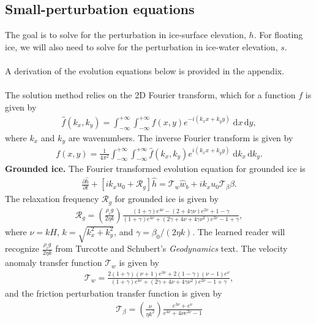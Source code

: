 \documentclass[paper=a4, fontsize=11pt]{article}
\begin{document}
\subsection*{Small-perturbation equations}
The goal is to solve for the perturbation in ice-surface elevation, $h$.
For floating ice, we will also need to solve for the perturbation
in ice-water elevation, $s$. \\ \\
A derivation of the evolution equations below is provided in the appendix.
\\ \\
The solution method relies on the 2D Fourier transform, which for a function $f$
is given by
\begin{align}
\hat{f}(k_x,k_y)  = \int_{-\infty}^{+\infty}\int_{-\infty}^{+\infty} f(x,y)e^{-i(k_x x + k_y y)} \; \mathrm{d}x\,\mathrm{d}y,
\end{align}
where $k_x$ and $k_y$ are wavenumbers.
The inverse Fourier transform is given by
\begin{align}
{f}(x,y) = \frac{1}{4\pi^2}\int_{-\infty}^{+\infty}\int_{-\infty}^{+\infty} \hat{f}(k_x,k_y)e^{i(k_x x + k_y y)} \; \mathrm{d}k_x \, \mathrm{d}k_y.
\end{align}
\textbf{Grounded ice.} The Fourier transformed evolution equation for grounded ice is
\begin{align}
\frac{\partial \hat{h}}{\partial t}+ \left[ik_xu_0  + \mathcal{R}_g\right]\hat{h} = \mathcal{T}_w\hat{w}_b+ik_xu_0\mathcal{T}_{\beta} \hat{\beta}.
\end{align}
The relaxation frequency $\mathcal{R}_g$ for grounded ice is given by
\begin{align}
\mathcal{R}_g = \left(\frac{\rho_i g }{2\eta k}\right)\frac{ (1+\gamma)e^{4\nu} -(2+4\gamma\nu)e^{2\nu} +1-\gamma  }{ (1+\gamma)e^{4\nu} + (2\gamma+4\nu+4\gamma\nu^2)e^{2\nu} -1 + \gamma  },
\end{align}
where $\nu = kH$, $k=\sqrt{k_x^2+k_y^2}$, and $\gamma = \beta_0/(2\eta k)$.
The learned reader will recognize $\frac{\rho_i g }{2\eta k}$ from Turcotte and Schubert's \emph{Geodynamics} text.
The velocity anomaly transfer function $\mathcal{T}_w$ is given by
\begin{align}
\mathcal{T}_w = \frac{2(1+\gamma)(\nu+1)e^{3\nu}+2(1-\gamma)(\nu-1)e^{\nu}  }{(1+\gamma)e^{4\nu} + (2\gamma+4\nu+4\gamma\nu^2)e^{2\nu} -1 + \gamma },
\end{align}
and the friction perturbation transfer function is given by
\begin{align}
\mathcal{T}_{\beta} =  \left(\frac{\nu}{\eta k^2}\right) \frac{e^{3\nu} + e^{\nu}}{e^{4\nu} +4\nu e^{2\nu} -1 }
\end{align}
\end{document}

